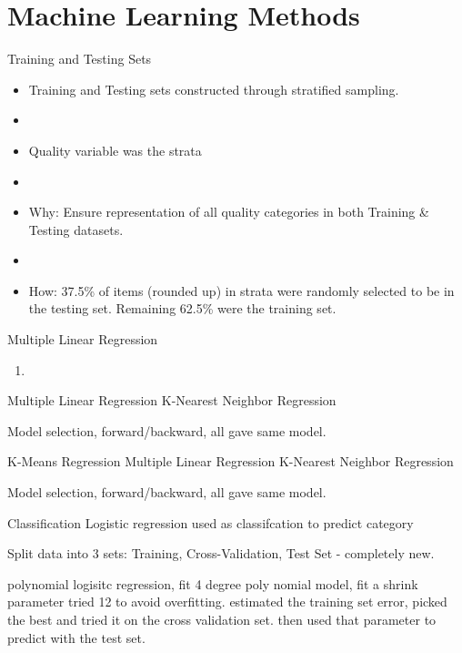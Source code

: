 \documentclass{beamer}
\begin{document}
\section{Machine Learning Methods}
\begin{frame}{Training and Testing Sets}
	\begin{itemize}
	\item Training and Testing sets constructed through stratified sampling.
	\item[]
	\item Quality variable was the strata
	\item[]
	\item Why: Ensure representation of all quality categories in both Training \& Testing datasets.
	\item[]
	\item How: 37.5\% of items (rounded up) in strata were randomly selected to be in the testing set. Remaining 62.5\% were the training set.
	\end{itemize}
\end{frame}

\begin{frame}{Multiple Linear Regression}


\begin{enumerate}
\item 
\end{enumerate}
Multiple Linear Regression
K-Nearest Neighbor Regression

Model selection, forward/backward, all gave same model. 


\end{frame}

\begin{frame}{K-Means Regression}
Multiple Linear Regression
K-Nearest Neighbor Regression

Model selection, forward/backward, all gave same model. 


\end{frame}

\begin{frame}{Classification}
Logistic regression used as classifcation to predict category 

Split data into 3 sets: Training, Cross-Validation, Test Set - completely new. 

polynomial logisitc regression, fit 4 degree poly nomial model, fit a shrink parameter tried 12 to avoid overfitting. estimated the training set error, picked the best and tried it on the cross validation set. then used that parameter to predict with the test set. 


\end{frame}
\end{document}
